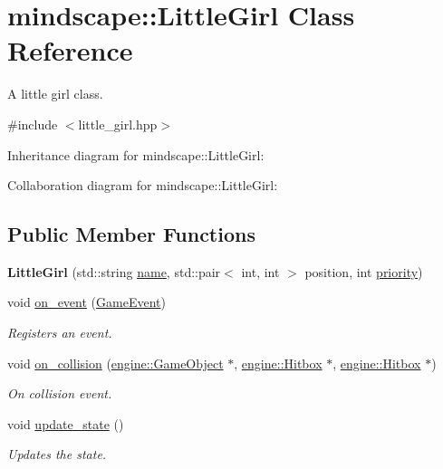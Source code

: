 \hypertarget{classmindscape_1_1_little_girl}{}\section{mindscape\+:\+:Little\+Girl Class Reference}
\label{classmindscape_1_1_little_girl}


A little girl class.  




{\ttfamily \#include $<$little\+\_\+girl.\+hpp$>$}



Inheritance diagram for mindscape\+:\+:Little\+Girl\+:


Collaboration diagram for mindscape\+:\+:Little\+Girl\+:
\subsection*{Public Member Functions}
\begin{DoxyCompactItemize}
\item 
{\bfseries Little\+Girl} (std\+::string \hyperlink{classengine_1_1_game_object_a1f104f7af4f351e6d3278319762c9fe5}{name}, std\+::pair$<$ int, int $>$ position, int \hyperlink{classengine_1_1_game_object_a159ecaca30229e302793b11a75bd13c2}{priority})\hypertarget{classmindscape_1_1_little_girl_aaa59cbc3cb94acf4004c39c670275ee9}{}\label{classmindscape_1_1_little_girl_aaa59cbc3cb94acf4004c39c670275ee9}

\item 
void \hyperlink{classmindscape_1_1_little_girl_aaebf64e03ace85b494da14cad0343207}{on\+\_\+event} (\hyperlink{class_game_event}{Game\+Event})
\begin{DoxyCompactList}\small\item\em Registers an event. \end{DoxyCompactList}\item 
void \hyperlink{classmindscape_1_1_little_girl_a9b90c01bbe0510338a8dce10f07eff2a}{on\+\_\+collision} (\hyperlink{classengine_1_1_game_object}{engine\+::\+Game\+Object} $\ast$, \hyperlink{classengine_1_1_hitbox}{engine\+::\+Hitbox} $\ast$, \hyperlink{classengine_1_1_hitbox}{engine\+::\+Hitbox} $\ast$)
\begin{DoxyCompactList}\small\item\em On collision event. \end{DoxyCompactList}\item 
void \hyperlink{classmindscape_1_1_little_girl_ac371a4bf4f1d4204eec7fb84551e6745}{update\+\_\+state} ()
\begin{DoxyCompactList}\small\item\em Updates the state. \end{DoxyCompactList}\end{DoxyCompactItemize}
